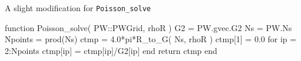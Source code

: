 A slight modification for {\tt Poisson_solve}

\begin{juliacode}
function Poisson_solve( PW::PWGrid, rhoR )
  G2 = PW.gvec.G2
  Ns = PW.Ns
  Npoints = prod(Ns)
  ctmp = 4.0*pi*R_to_G( Ns, rhoR )
  ctmp[1] = 0.0
  for ip = 2:Npoints
    ctmp[ip] = ctmp[ip]/G2[ip]
  end
  return ctmp
end
\end{juliacode}
